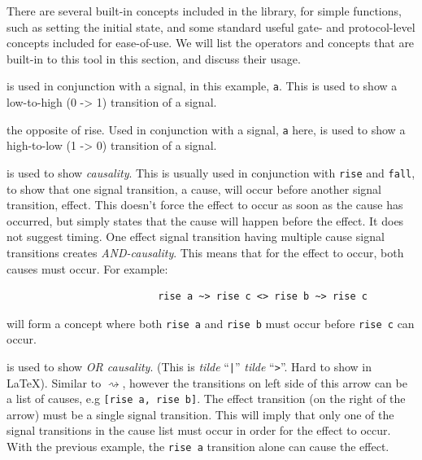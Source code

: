 \documentclass[british,technote,compsoc]{IEEEtran}
\begin{document}
There are several built-in concepts included in the library, for simple functions, such as setting the initial state, and some standard useful gate- and protocol-level concepts included for 
ease-of-use. We will list the operators and concepts that are built-in to this tool in this section, and discuss their usage. 

\begin{description}[align=left]
  \item [\texttt{rise a}] is used in conjunction with a signal, in this example, \texttt{a}. This is used to show a low-to-high (0 -> 1) transition of a signal.
  
  \item [\texttt{fall a}] the opposite of rise. Used in conjunction with a signal, \texttt{a} here,  is used to show a high-to-low (1 -> 0) transition of a signal.
  
  \item [\texttt{$\rightsquigarrow$}] is used to show \emph{causality}. This is usually used in conjunction with \texttt{rise} and \texttt{fall}, to show that one signal transition, a cause, will occur 
   before another signal transition, effect. This doesn't force the effect to occur as soon as the cause has occurred, but simply states that the cause will happen before the effect. It does 
   not suggest timing. One effect signal transition having multiple cause signal transitions creates \emph{AND-causality}. This means that for the effect to occur, both causes must occur. 
   For example: 
\begin{verbatim}
                          rise a ~> rise c <> rise b ~> rise c
\end{verbatim}
   will form a concept where both \texttt{rise a} and \texttt{rise b} must occur before \texttt{rise c} can occur.
   
   \item [\texttt{\textasciitilde{}|\textasciitilde{}>}] is used to show \emph{OR causality}. (This is \emph{tilde} ``\texttt{|}'' \emph{tilde} ``\texttt{>}''. Hard to show in LaTeX). Similar to 
   $\rightsquigarrow$, however the transitions on left side of this arrow can be a list of causes, e.g \texttt{[rise a, rise b]}. The effect transition (on the right of the arrow) must be a single 
   signal transition. This will imply that only one of the    signal transitions in the cause list must occur in order for the effect to occur. With the previous example, the \texttt{rise a} transition
    alone can cause the effect. 
   

\end{description}
\end{document}
